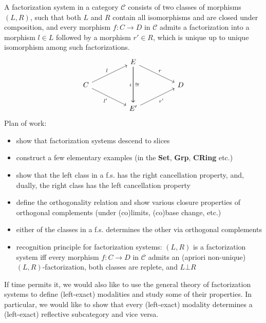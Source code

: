 %

A factorization system in a category $\mathcal{C}$ consists of two classes of morphisms $(L,R)$, such that both $L$ and $R$ contain all isomorphisms and are closed under composition, and every morphism $f: C \to D$ in $\mathcal{C}$ admits a factorization into a morphism $l\in L$ followed by a morphism $r'\in R$, which is unique up to unique isomorphism among such factorizations.
\[\begin{tikzcd}
	&& E \\
	C &&&& D \\
	&& {E'}
	\arrow["r", from=1-3, to=2-5]
	\arrow["i"', from=1-3, to=3-3]
	\arrow["\cong", from=1-3, to=3-3]
	\arrow["l", from=2-1, to=1-3]
	\arrow["{l'}"', from=2-1, to=3-3]
	\arrow["{r'}"', from=3-3, to=2-5]
\end{tikzcd}\]
Plan of work:
\begin{itemize}
    \item show that factorization systems descend to slices
    \item construct a few elementary examples (in the \textbf{Set}, \textbf{Grp}, \textbf{CRing} etc.)
    \item show that the left class in a f.s. has the right cancellation property, and, dually, the right class has the left cancellation property
    \item define the orthogonality relation and show various closure properties of orthogonal complements (under (co)limits, (co)base change, etc.) 
    \item either of the classes in a f.s. determines the other via orthogonal complements
    \item recognition principle for factorization systems: $(L,R)$ is a factorization system iff every morphism $f: C \to D$ in $\mathcal{C}$ admits an (apriori non-unique) $(L,R)$-factorization, both classes are replete, and $L\bot R$
\end{itemize}
If time permits it, we would also like to use the general theory of factorization systems to define (left-exact) modalities and study some of their properties. In particular, we would like to show that every (left-exact) modality determines a (left-exact) reflective subcategory and vice versa.
